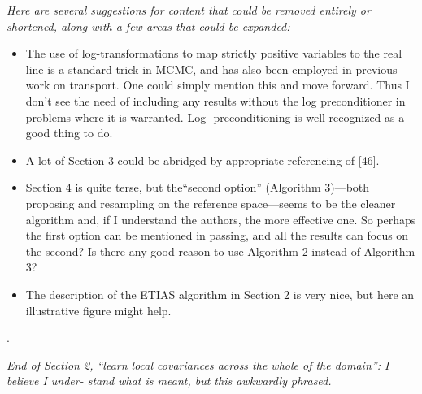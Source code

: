 \documentclass{article}
\newcommand{\comment}[2]{\vspace{0.6cm}{\bf Comment:} {\it #1.}

\vspace{0.3cm}{\bf Answer:} #2}
\begin{document}
\comment{Here are several suggestions for content that could be removed entirely or shortened, along with a few areas that could be expanded:
  \begin{itemize}
    \item The use of log-transformations to map strictly positive variables to the real line is a standard trick in MCMC, and has also been employed in previous work on transport. One could simply mention this and move forward. Thus I don’t see the need of including any results without the log preconditioner in problems where it is warranted. Log- preconditioning is well recognized as a good thing to do.
\item A lot of Section 3 could be abridged by appropriate referencing of [46].
\item Section 4 is quite terse, but the“second option” (Algorithm 3)—both proposing and resampling on the reference space—seems to be the cleaner algorithm and, if I understand the authors, the more effective one. So perhaps the first option can be mentioned in passing, and all the results can focus on the second? Is there any good reason to use Algorithm 2 instead of Algorithm 3?
\item The description of the ETIAS algorithm in Section 2 is very nice, but here an illustrative figure might help. \end{itemize}}{}

\comment{End of Section 2, “learn local covariances across the whole of the domain”: I believe I under- stand what is meant, but this awkwardly phrased}{}
\end{document}
